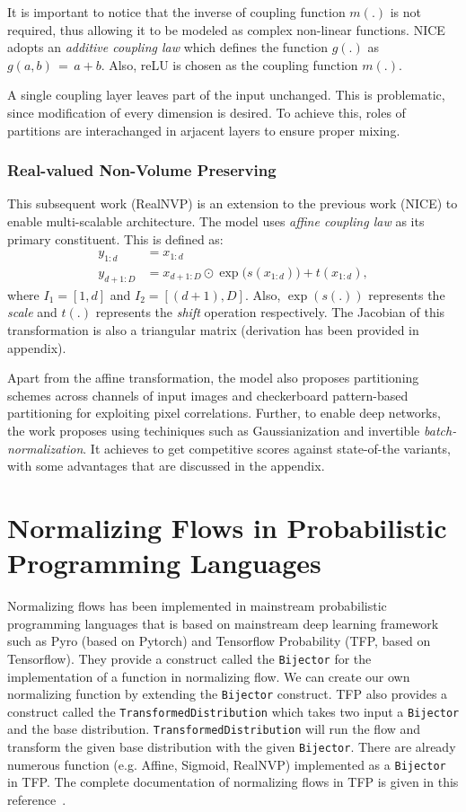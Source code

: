 \documentclass[runningheads]{llncs}
\begin{document}
It is important to notice that the inverse of coupling function $m(.)$ is not required, thus allowing it to be modeled as complex non-linear functions. NICE adopts an \textit{additive coupling law} which defines the function $g(.)$ as $g(a,b)\,=\,a+b$. Also, reLU is chosen as the coupling function $m(.)$.

A single coupling layer leaves part of the input unchanged. This is problematic, since modification of every dimension is desired. To achieve this, roles of partitions are interachanged in arjacent layers to ensure proper mixing. 
 
\subsubsection{Real-valued Non-Volume Preserving} \label{sec:realnvp}
This subsequent work (RealNVP) \cite{dinh2016density} is an extension to the previous work (NICE) to enable multi-scalable architecture. The model uses \textit{affine coupling law} as its primary constituent. This is defined as:
\begin{align}
y_{1:d} &= x_{1:d}\\
y_{d+1:D} &= x_{d+1:D} \odot \exp\big(s(x_{1:d})\big) + t(x_{1:d})
,
\end{align}
where $I_1 = [1,d]$ and $I_2 = [(d+1),D]$. Also, $\exp(s(.))$ represents the \textit{scale} and $t(.)$ represents the \textit{shift} operation respectively. The Jacobian of this transformation is also a triangular matrix (derivation has been provided in appendix).

Apart from the affine transformation, the model also proposes partitioning schemes across channels of input images and checkerboard pattern-based partitioning for exploiting pixel correlations. Further, to enable deep networks, the work proposes using techiniques such as Gaussianization and invertible \textit{batch-normalization}. It achieves to get competitive scores against state-of-the variants, with some advantages that are discussed in the appendix.

\section{Normalizing Flows in Probabilistic Programming Languages}
Normalizing flows has been implemented in mainstream probabilistic programming languages that is based on mainstream deep learning framework such as Pyro (based on Pytorch) and Tensorflow Probability (TFP, based on Tensorflow). They provide a construct called the \texttt{Bijector} for the implementation of a function in normalizing flow. We can create our own normalizing function by extending the \texttt{Bijector} construct. TFP also provides a construct called the \texttt{TransformedDistribution} which takes two input a \texttt{Bijector} and the base distribution. \texttt{TransformedDistribution} will run the flow and transform the given base distribution with the given \texttt{Bijector}. There are already numerous function (e.g. Affine, Sigmoid, RealNVP) implemented as a \texttt{Bijector} in TFP. The complete documentation of normalizing flows in TFP is given in this reference~\cite{dillon2017tensorflow}.
\end{document}
